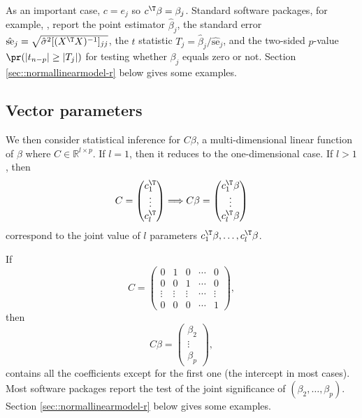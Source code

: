 As an important case, $c=e_j$ so $c^{\T} \beta = \beta_j$. Standard software packages, for example, , report the point estimator $\hat{\beta}_j$, the standard error $\hat{\text{se}}_j = \sqrt{ \hat{\sigma}^2 [(X^{\T}X)^{-1}]_{jj} }$, the $t$ statistic $T_j = \hat{\beta}_j / \hat{\text{se}}_j $, and the two-sided $p$-value $\pr( | t_{n-p} | \geq  |T_j|  )$ for testing whether $\beta_j$ equals zero or not. Section \ref{sec::normallinearmodel-r} below gives some examples. 



\subsection{Vector parameters}
We then consider statistical inference for $C\beta$, a multi-dimensional
linear function of $\beta$ where $C\in\mathbb{R}^{l\times p}.$ If
$l=1$, then it reduces to the one-dimensional case. If $l>1$, then 
$$
C = \begin{pmatrix}
c_1^{\T} \\
\vdots \\
c_l^{\T}
\end{pmatrix} \Longrightarrow 
C\beta = \begin{pmatrix}
c_1^{\T} \beta \\
\vdots \\
c_l^{\T} \beta
\end{pmatrix}
$$
correspond to the joint value of $l$ parameters $ c_1^{\T} \beta, \ldots,c_l^{\T} \beta$.

\begin{example}\label{eg::testing-1}
If
\[
C=\left(\begin{array}{ccccc}
0 & 1 & 0 & \cdots & 0\\
0 & 0 & 1 & \cdots & 0\\
\vdots & \vdots & \vdots & \cdots & \vdots\\
0 & 0 & 0 & \cdots & 1
\end{array}\right) , 
\]
then 
\[
C\beta=\left(\begin{array}{c}
\beta_{2}\\
\vdots\\
\beta_{p}
\end{array}\right),
\]
contains all the coefficients except for the first one (the
intercept in most cases). Most software packages report the test of
the joint significance of $(\beta_{2}, \ldots, \beta_{p})$. Section \ref{sec::normallinearmodel-r} below gives some examples. 
\end{example}

